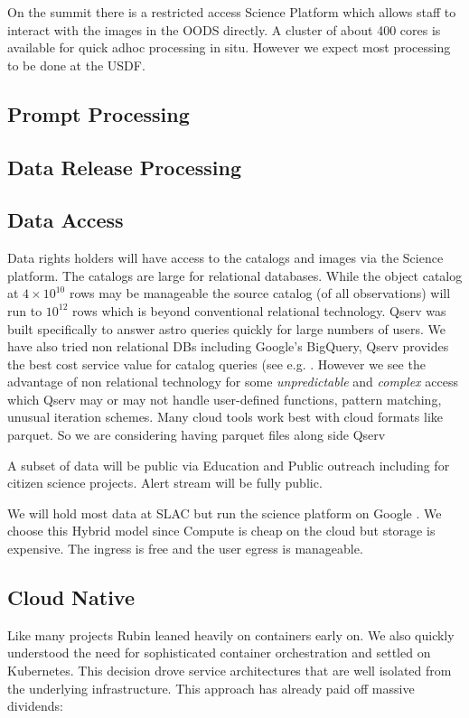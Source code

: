 \documentclass[11pt,twoside]{article}
\begin{document}
On the summit there is a restricted access Science Platform which allows staff to interact with the  images in the OODS directly. A cluster of about 400 cores is available for quick adhoc processing in situ. However we expect most processing to be done at the USDF.

\subsection{Prompt Processing} \label{sec:prompt}
\subsection{Data Release Processing}\label{sec:DRP}

\subsection{Data Access} \label{sec:dataaccess}

Data rights holders will have access to the catalogs and images via the Science platform.
The catalogs are large for relational databases.
While the object catalog at $4 \times 10^{10}$ rows may be manageable
the source catalog (of all observations) will run to $ 10^{12}$ rows which is beyond conventional relational technology.
Qserv \citep{C15_adassxxxii} was built specifically to answer astro queries quickly for large numbers of users.
We have also tried non relational DBs including Google's BigQuery, Qserv provides the best cost service value for catalog queries (see e.g. \citet{Document-31100}.
However we see the advantage of non relational technology for
some  \emph{unpredictable} and \emph{complex} access which Qserv may or may not handle user-defined functions, pattern matching, unusual iteration schemes.
Many cloud tools work best with cloud formats like parquet.
So we are considering having parquet files along side Qserv

A subset of data will be public via Education and Public outreach including for citizen science projects.
Alert stream will be fully public.

We will hold most data at SLAC but run the science platform on Google \citep{2021arXiv211115030O}.
We choose this Hybrid model since Compute is cheap on the cloud but storage is expensive.
The ingress is free and the user egress is manageable.

\subsection{Cloud Native}\label{sec:cloudnative}
Like many projects \citep{2017ASPC..512...33O} Rubin leaned heavily on containers early on.
We also quickly understood the need for sophisticated container orchestration and settled on Kubernetes.
This decision drove service architectures that are well isolated from the underlying infrastructure.
This approach has already paid off massive dividends:
\end{document}
